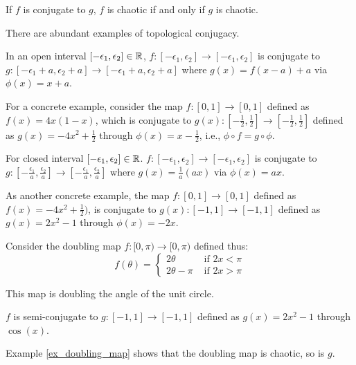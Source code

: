 \begin{prop}\label{prop_conj_chaos}
	If $f$ is conjugate to $g$, $f$ is chaotic if and only if $g$ is chaotic.
\end{prop}

There are abundant examples of topological conjugacy.

\begin{example}
	In an open interval $[-\epsilon_1, \epsilon_2] \in \mathbb{R}$,
	$f: [-\epsilon_1, \epsilon_2] \rightarrow [-\epsilon_1, \epsilon_2]$
	is conjugate to 
	$g: [-\epsilon_1 + a, \epsilon_2 + a] \rightarrow  [-\epsilon_1 + a, \epsilon_2 + a]$
	where $g(x)= f(x -a) + a$ via $\phi(x) = x + a$.

	For a concrete example, consider the map 
	$f: [0,1] \rightarrow [0,1]$
	defined as $f(x) = 4x(1-x)$,
	which is conjugate to 
	$g(x): [-\frac{1}{2}, \frac{1}{2}] \rightarrow [-\frac{1}{2}, \frac{1}{2}]$
	defined as $g(x) = -4x^2 + \frac{1}{2}$ 
	through $\phi(x) = x -\frac{1}{2}$, i.e., $ \phi \circ f=  g \circ \phi$.
\end{example}

\begin{example}
	For closed interval $[-\epsilon_1, \epsilon_2] \in \mathbb{R}$. 
	$f: [-\epsilon_1, \epsilon_2] \rightarrow [-\epsilon_1, \epsilon_2]$
	is conjugate to 
	$g: [-\frac{\epsilon_1}{a}, \frac{\epsilon_2}{a}] \rightarrow [-\frac{\epsilon_1}{a}, \frac{\epsilon_2}{a}]$
	where $g(x)= \frac{1}{a}(ax)$ via $\phi(x) = ax$.


	As another concrete example, the map $f: [0,1] \rightarrow [0,1]$
	defined as $f(x) = -4x^2 + \frac{1}{2})$,
	is conjugate to 
	$g(x): [-1, 1] \rightarrow [-1, 1]$
	defined as $g(x) = 2x^2 - 1$
	through $\phi(x) = -2x$.
\end{example}

\begin{example}
	Consider the doubling map $f: [0,\pi) \rightarrow [0, \pi)$ defined thus: 
	$$
	f(\theta) = 
		\begin{cases}
			2 \theta &\text{ if } 2x <  \pi \\
			2 \theta - \pi &\text{ if } 2x > \pi
		\end{cases}
	$$
	
	This map is doubling the angle of the unit circle.

	$f$ is semi-conjugate to $g: [-1, 1] \rightarrow [-1, 1]$ defined as $g(x) = 2x^2 - 1$ through $\cos(x)$.

	Example \ref{ex_doubling_map} shows that the doubling map is chaotic, so is $g$.
\end{example}

